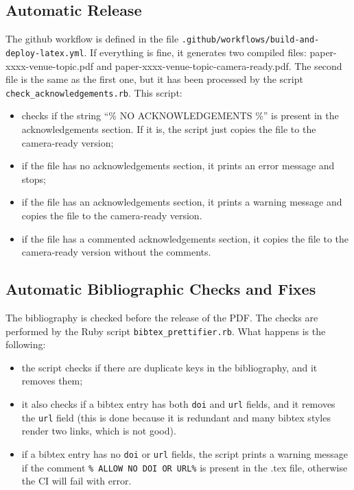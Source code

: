 \documentclass[final,5pt,times,twocolumn]{elsarticle}
\begin{document}
        \subsection{Automatic Release}\label{subsec:automatic-release}
            The github workflow is defined in the file \texttt{.github/workflows/build-and-deploy-latex.yml}.
            If everything is fine, it generates two compiled files: paper-xxxx-venue-topic.pdf and paper-xxxx-venue-topic-camera-ready.pdf.
            The second file is the same as the first one, but it has been processed by the script \texttt{check\_acknowledgements.rb}.
            This script:
            \begin{itemize}
                \item checks if the string ``\% NO ACKNOWLEDGEMENTS \%'' is present in the acknowledgements section.
                If it is, the script just copies the file to the camera-ready version;
                \item if the file has no acknowledgements section, it prints an error message and stops;
                \item if the file has an acknowledgements section, it prints a warning message and copies the file to the camera-ready version.
                \item if the file has a commented acknowledgements section, it copies the file to the camera-ready version without the comments.
            \end{itemize}

        \subsection{Automatic Bibliographic Checks and Fixes}\label{subsec:automatic-checks-and-fixes-on-the-bibliography}
            The bibliography is checked before the release of the PDF.
            The checks are performed by the Ruby script \texttt{bibtex\_prettifier.rb}.
            What happens is the following:
            \begin{itemize}
                \item the script checks if there are duplicate keys in the bibliography, and it removes them;
                \item it also checks if a bibtex entry has both \texttt{doi} and \texttt{url} fields, and it removes the \texttt{url} field (this is done because it is redundant and many bibtex styles render two links, which is not good).
                \item if a bibtex entry has no \texttt{doi} or \texttt{url} fields, the script prints a warning message if the comment \texttt{\% ALLOW NO DOI OR URL\%} is present in the .tex file, otherwise the CI will fail with error.
            \end{itemize}
\end{document}
